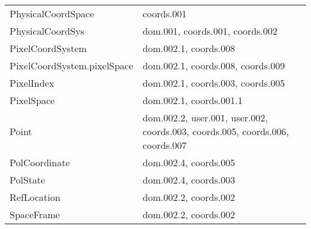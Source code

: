 \begin{longtable}[l]{|l|l|}
        PhysicalCoordSpace                & coords.001                                  \\
        PhysicalCoordSys                  & dom.001, coords.001, coords.002             \\
        PixelCoordSystem                  & dom.002.1, coords.008                       \\
        PixelCoordSystem.pixelSpace       & dom.002.1, coords.008, coords.009           \\
        PixelIndex                        & dom.002.1, coords.003, coords.005           \\
        PixelSpace                        & dom.002.1, coords.001.1                     \\
        Point                             & dom.002.2, user.001, user.002, coords.003, coords.005, coords.006, coords.007     \\
        PolCoordinate                     & dom.002.4, coords.005              \\
        PolState                          & dom.002.4, coords.003                       \\
        RefLocation                       & dom.002.2, coords.002                       \\
        SpaceFrame                        & dom.002.2, coords.002                       \\

\end{longtable}
